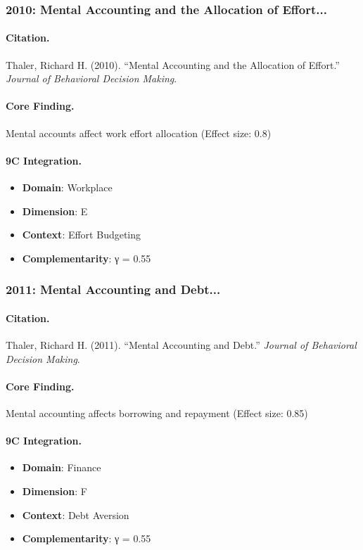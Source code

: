 \subsubsection{2010: Mental Accounting and the Allocation of Effort...}

\paragraph{Citation.}
Thaler, Richard H. (2010). ``Mental Accounting and the Allocation of Effort.''
\textit{Journal of Behavioral Decision Making}.

\paragraph{Core Finding.}
Mental accounts affect work effort allocation (Effect size: 0.8)

\paragraph{9C Integration.}
\begin{itemize}[nosep]
  \item \textbf{Domain}: Workplace
  \item \textbf{Dimension}: E
  \item \textbf{Context}: Effort Budgeting
  \item \textbf{Complementarity}: γ = 0.55
\end{itemize}

\subsubsection{2011: Mental Accounting and Debt...}

\paragraph{Citation.}
Thaler, Richard H. (2011). ``Mental Accounting and Debt.''
\textit{Journal of Behavioral Decision Making}.

\paragraph{Core Finding.}
Mental accounting affects borrowing and repayment (Effect size: 0.85)

\paragraph{9C Integration.}
\begin{itemize}[nosep]
  \item \textbf{Domain}: Finance
  \item \textbf{Dimension}: F
  \item \textbf{Context}: Debt Aversion
  \item \textbf{Complementarity}: γ = 0.55
\end{itemize}

